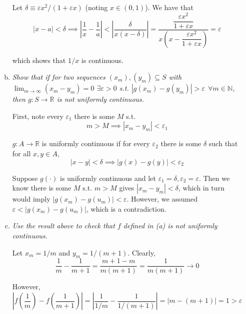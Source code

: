 \documentclass{article}
\begin{document}
\begin{enumerate}[1.]
\begin{enumerate}[a)]
        Let $\delta \equiv \varepsilon x^2 / (1 + \varepsilon x)$ (noting $x \in (0, 1)$). We have that
        \[
            |x - a| < \delta
            \implies
            \left|\dfrac{1}{x} - \dfrac{1}{a}\right|
            <
            \left|\dfrac{\delta}{x (x - \delta)}\right|
            =
            \dfrac{\dfrac{\varepsilon x^2}{1 + \varepsilon x}}{x \left(x - \dfrac{\varepsilon x^2}{1 + \varepsilon x}\right)}
            =
            \varepsilon
        \]

        which shows that $1/x$ is continuous.

      \item \textit{Show that if for two sequences $(x_m), (y_m) \subseteq S$ with $\lim_{m \to \infty} (x_m - y_m) = 0$ $\exists \varepsilon > 0$ s.t. $|g(x_m) - g(y_m)| > \varepsilon ~~ \forall m \in \mathbb{N}$, then $g: S \to \mathbb{R}$ is not uniformly continuous.}

        \solution First, note every $\varepsilon_1$ there is some $M$ s.t.
        \[
            m > M \implies |x_m - y_m| < \varepsilon_1
        \]

        $g: A \to \mathbb{R}$ is uniformly continuous if for every $\varepsilon_2$ there is some $\delta$ such that for all $x, y \in A$,
        \[
            |x - y| < \delta \implies |g(x) - g(y)| < \varepsilon_2
        \]

        Suppose $g(\cdot)$ is uniformly continuous and let $\varepsilon_1 = \delta, \varepsilon_2 = \varepsilon$. Then we know there is some $M$ s.t. $m > M$ gives $|x_m - y_m| < \delta$, which in turn would imply $|g(x_m) - g(u_m)| < \varepsilon$. However, we assumed $\varepsilon < |g(x_m) - g(u_m)|$, which is a contradiction.

      \item \textit{Use the result above to check that $f$ defined in (a) is not uniformly continuous.}

        \solution Let $x_m = 1 / m$ and $y_m = 1 / (m + 1)$. Clearly,
        \[
          \dfrac{1}{m} - \dfrac{1}{m + 1}
          =
          \dfrac{m + 1 - m}{m (m + 1)}
          =
          \dfrac{1}{m (m + 1)}
          \to
          0
        \]

        However,
        \[
          \left|f\left(\dfrac{1}{m}\right) - f\left(\dfrac{1}{m + 1}\right)\right|
          =
          \left|\dfrac{1}{1 / m} - \dfrac{1}{1 / (m + 1)}\right|
          =
          \left|m - (m + 1)\right|
          =
          1
          >
          \varepsilon
        \]


\end{enumerate}
\end{enumerate}
\end{document}
